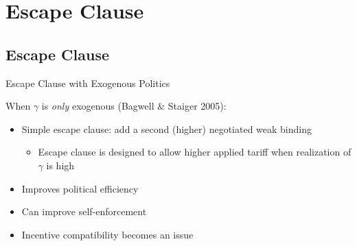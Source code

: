 \documentclass[handout]{beamer}
\newcommand{\bta}{\bm{\tau^a}}
\newcommand{\btn}{\bm{\tau^{tw}}}
\newcommand{\ga}{\gamma}
\begin{document}
{


\section{Escape Clause}
\subsection{Escape Clause}
\begin{frame}{Escape Clause with Exogenous Politics}

\pause
When $\ga$ is \textit{only} exogenous (Bagwell $\&$ Staiger 2005):

\pause
\begin{itemize}[<+->]
	\item Simple escape clause: add a second (higher) negotiated weak binding
		\begin{itemize}
			\item Escape clause is designed to allow higher applied tariff when realization of $\ga$ is high
		\end{itemize}
	\item Improves political efficiency
	\item Can improve self-enforcement
	\item Incentive compatibility becomes an issue
\end{itemize}
\end{frame}


}
\end{document}
